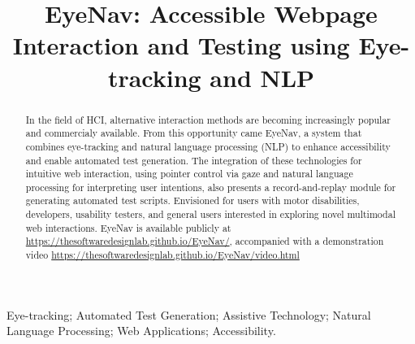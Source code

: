 \documentclass[10pt, conference]{IEEEtran}
\begin{document}
\title{EyeNav: Accessible Webpage Interaction and Testing using Eye-tracking and NLP}

\author{
}

\maketitle

\begin{abstract}
In the field of \ac{HCI}, alternative interaction methods are becoming increasingly popular and commercialy available. From this opportunity came EyeNav, a system that combines eye-tracking and natural language processing (NLP) to enhance accessibility and enable automated test generation. The integration of these technologies for intuitive web interaction, using pointer control via gaze and natural language processing for interpreting user intentions, also presents a record-and-replay module for generating automated test scripts. Envisioned for users with motor disabilities, developers, usability testers, and general users interested in exploring novel multimodal web interactions. EyeNav is available publicly at \href{https://thesoftwaredesignlab.github.io/EyeNav/}{https://thesoftwaredesignlab.github.io/EyeNav/}, accompanied with a demonstration video \href{https://thesoftwaredesignlab.github.io/EyeNav/video.html}{https://thesoftwaredesignlab.github.io/EyeNav/video.html} 
\end{abstract}


\begin{IEEEkeywords}
Eye-tracking; Automated Test Generation; Assistive Technology; Natural Language Processing; Web Applications; Accessibility.
\end{IEEEkeywords}







\balance


\end{document}

